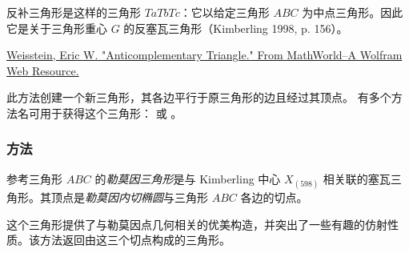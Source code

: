 反补三角形是这样的三角形 $TaTbTc$：它以给定三角形 $ABC$ 为中点三角形。因此它是关于三角形重心 $G$ 的反塞瓦三角形（Kimberling 1998, p. 156）。\begin{flushright}
  \small
\href{[URL1]}{Weisstein, Eric W. "Anticomplementary Triangle." From MathWorld--A Wolfram Web Resource.}
\end{flushright}

此方法创建一个新三角形，其各边平行于原三角形的边且经过其顶点。
有多个方法名可用于获得这个三角形： 或 。

\vspace{1em}

\begin{minipage}{.5\textwidth}
\begin{center}
\end{center}
\end{minipage}
\begin{minipage}{.5\textwidth}
\begin{tkzexample}
\end{tkzexample}
\end{minipage}

\subsubsection{方法 }
\label{ssub:method_triangle_lemoine}

参考三角形 $ABC$ 的\emph{勒莫因三角形}是与 Kimberling 中心 $X_{(598)}$ 相关联的塞瓦三角形。其顶点是\emph{勒莫因内切椭圆}与三角形 $ABC$ 各边的切点。

\medskip

这个三角形提供了与勒莫因点几何相关的优美构造，并突出了一些有趣的仿射性质。该方法返回由这三个切点构成的三角形。

